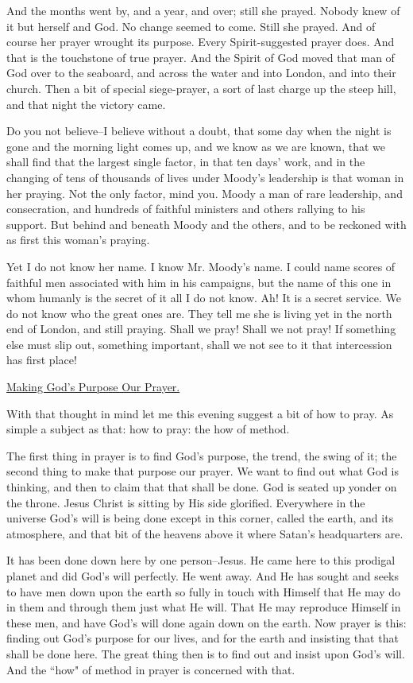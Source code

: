 And the months went by, and a year, and over; still she prayed. Nobody
knew of it but herself and God. No change seemed to come. Still she
prayed. And of course her prayer wrought its purpose. Every
Spirit-suggested prayer does. And that is the touchstone of true prayer.
And the Spirit of God moved that man of God over to the seaboard, and
across the water and into London, and into their church. Then a bit of
special siege-prayer, a sort of last charge up the steep hill, and that
night the victory came.

Do you not believe--I believe without a doubt, that some day when the
night is gone and the morning light comes up, and we know as we are known,
that we shall find that the largest single factor, in that ten days' work,
and in the changing of tens of thousands of lives under Moody's leadership
is that woman in her praying. Not the only factor, mind you. Moody a man
of rare leadership, and consecration, and hundreds of faithful ministers
and others rallying to his support. But behind and beneath Moody and the
others, and to be reckoned with as first this woman's praying.

Yet I do not know her name. I know Mr. Moody's name. I could name scores
of faithful men associated with him in his campaigns, but the name of this
one in whom humanly is the secret of it all I do not know. Ah! It is a
secret service. We do not know who the great ones are. They tell me she is
living yet in the north end of London, and still praying. Shall we pray!
Shall we not pray! If something else must slip out, something important,
shall we not see to it that intercession has first place!



\underline{Making God's Purpose Our Prayer.}


With that thought in mind let me this evening suggest a bit of how to
pray. As simple a subject as that: how to pray: the how of method.

The first thing in prayer is to find God's purpose, the trend, the swing
of it; the second thing to make that purpose our prayer. We want to find
out what God is thinking, and then to claim that that shall be done. God
is seated up yonder on the throne. Jesus Christ is sitting by His side
glorified. Everywhere in the universe God's will is being done except in
this corner, called the earth, and its atmosphere, and that bit of the
heavens above it where Satan's headquarters are.

It has been done down here by one person--Jesus. He came here to this
prodigal planet and did God's will perfectly. He went away. And He has
sought and seeks to have men down upon the earth so fully in touch with
Himself that He may do in them and through them just what He will. That He
may reproduce Himself in these men, and have God's will done again down on
the earth. Now prayer is this: finding out God's purpose for our lives,
and for the earth and insisting that that shall be done here. The great
thing then is to find out and insist upon God's will. And the ``how" of
method in prayer is concerned with that.

